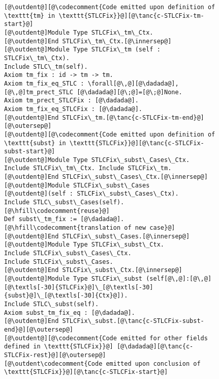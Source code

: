 \begin{figure}
\vspace{-5pt}
\begin{minipage}{\textwidth}
\begin{multicols}{2}



\newcommand{\innersep}{\vspace{6pt}}
\newcommand{\outersep}{\vspace{5pt}}
\newcommand{\outdent}{\!\!\!}


\begin{lstlisting}
[@\outdent@][@\codecomment{Code emitted upon definition of \texttt{tm} in \texttt{STLCFix}}@][@\tanc{c-STLCFix-tm-start}@]
[@\outdent@]Module Type STLCFix\_tm\_Ctx.
[@\outdent@]End STLCFix\_tm\_Ctx.[@\innersep@]
[@\outdent@]Module Type STLCFix\_tm (self : STLCFix\_tm\_Ctx).
Include STLC\_tm(self).
Axiom tm_fix : id -> tm -> tm.
Axiom tm_fix_eq_STLC : \forall[@\,@][@\dadada@],[@\,@]tm_prect_STLC [@\dadada@][@\;@]=[@\;@]None.
Axiom tm_prect_STLCFix : [@\dadada@].
Axiom tm_fix_eq_STLCFix : [@\dadada@].
[@\outdent@]End STLCFix\_tm.[@\tanc{c-STLCFix-tm-end}@][@\outersep@]
[@\outdent@][@\codecomment{Code emitted upon definition of \texttt{subst} in \texttt{STLCFix}}@][@\tanc{c-STLCFix-subst-start}@]
[@\outdent@]Module Type STLCFix\_subst\_Cases\_Ctx.
Include STLCFix\_tm\_Ctx. Include STLCFix\_tm.
[@\outdent@]End STLCFix\_subst\_Cases\_Ctx.[@\innersep@]
[@\outdent@]Module STLCFix\_subst\_Cases
[@\outdent@](self : STLCFix\_subst\_Cases\_Ctx).
Include STLC\_subst\_Cases(self).[@\hfill\codecomment{reuse}@]
Def subst\_tm_fix := [@\dadada@].[@\hfill\codecomment{translation of new case}@]
[@\outdent@]End STLCFix\_subst\_Cases.[@\innersep@]
[@\outdent@]Module Type STLCFix\_subst\_Ctx.
Include STLCFix\_subst\_Cases\_Ctx.
Include STLCFix\_subst\_Cases.
[@\outdent@]End STLCFix\_subst\_Ctx.[@\innersep@]
[@\outdent@]Module Type STLCFix\_subst (self[@\,@]:[@\,@][@\textls[-30]{STLCFix}@]\_[@\textls[-30]{subst}@]\_[@\textls[-30]{Ctx}@]).
Include STLC\_subst(self).
Axiom subst_tm_fix_eq : [@\dadada@].
[@\outdent@]End STLCFix\_subst.[@\tanc{c-STLCFix-subst-end}@][@\outersep@]
[@\outdent@][@\codecomment{Code emitted for other fields defined in \texttt{STLCFix}}@] [@\dadada@][@\tanc{c-STLCFix-rest}@][@\outersep@]
[@\outdent\codecomment{Code emitted upon conclusion of \texttt{STLCFix}}@][@\tanc{c-STLCFix-start}@]

\end{lstlisting}
\end{multicols}
\end{minipage}
\end{figure}
